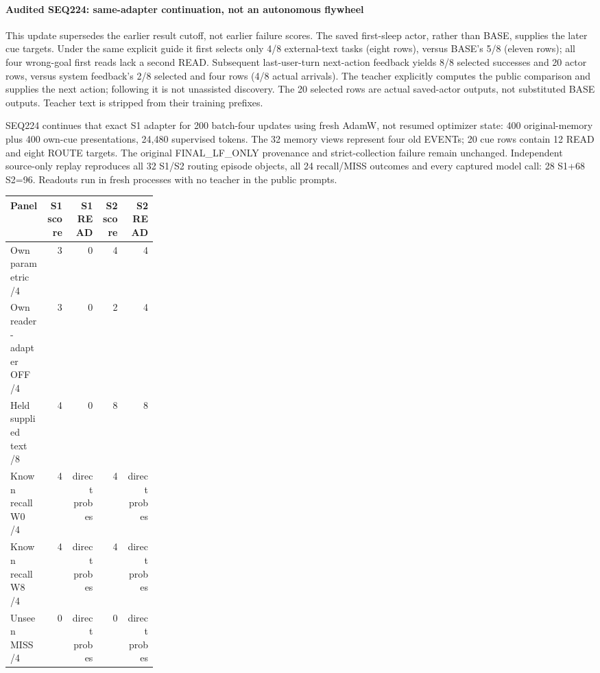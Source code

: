 \documentclass[11pt]{article}
\begin{document}
\paragraph{Audited SEQ224: same-adapter continuation, not an autonomous flywheel}

This update supersedes the earlier result cutoff, not earlier failure scores.
The saved first-sleep actor, rather than BASE, supplies the later cue targets.
Under the same explicit guide it first selects only 4/8 external-text tasks
(eight rows), versus BASE's 5/8 (eleven rows); all four wrong-goal first reads
lack a second READ. Subsequent last-user-turn next-action feedback yields
8/8 selected successes and 20 actor rows, versus system feedback's 2/8 selected
and four rows (4/8 actual arrivals). The teacher explicitly computes the public
comparison and supplies the next action; following it is not unassisted discovery.
The 20 selected rows are actual saved-actor outputs, not substituted BASE outputs.
Teacher text is stripped from their training prefixes.

SEQ224 continues that exact S1 adapter for 200 batch-four updates using fresh
AdamW, not resumed optimizer state: 400 original-memory plus 400 own-cue
presentations, 24,480 supervised tokens. The 32 memory views represent four
old EVENTs; 20 cue rows contain 12 READ and eight ROUTE targets. The original
FINAL\_LF\_ONLY provenance and strict-collection failure remain unchanged.
Independent source-only replay reproduces all 32 S1/S2 routing episode objects,
all 24 recall/MISS outcomes and every captured model call: 28 S1+68 S2=96.
Readouts run in fresh processes with no teacher in the public prompts.

\begin{center}
\small
\begin{tabular}{p{0.25\linewidth}rrrr}
\toprule
Panel & S1 score & S1 READ & S2 score & S2 READ \\
\midrule
Own parametric /4 & 3 & 0 & 4 & 4 \\
Own reader-adapter OFF /4 & 3 & 0 & 2 & 4 \\
Held supplied text /8 & 4 & 0 & 8 & 8 \\
Known recall W0 /4 & 4 & direct probes & 4 & direct probes \\
Known recall W8 /4 & 4 & direct probes & 4 & direct probes \\
Unseen MISS /4 & 0 & direct probes & 0 & direct probes \\
\bottomrule
\end{tabular}
\end{center}
\end{document}
